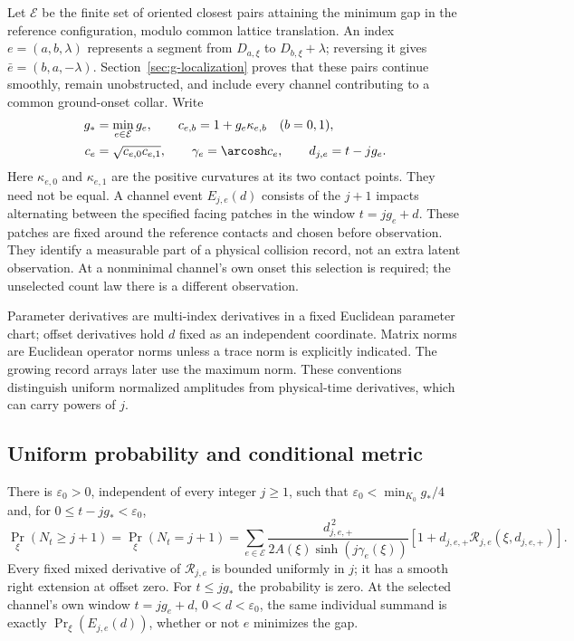 Let $\mathcal E$ be the finite set of oriented closest pairs attaining
the minimum gap in the reference configuration, modulo common lattice
translation. An index $e=(a,b,\lambda)$ represents a segment from
$D_{a,\xi}$ to $D_{b,\xi}+\lambda$; reversing it gives
$\bar e=(b,a,-\lambda)$. Section~\ref{sec:g-localization} proves that
these pairs continue smoothly, remain unobstructed, and include every
channel contributing to a common ground-onset collar. Write
\begin{equation}\label{eq:g-general-data}
 \begin{split}
 g_*&=\min_{e\in\mathcal E}g_e,\qquad
 c_{e,b}=1+g_e\kappa_{e,b}\quad(b=0,1),\\
 c_e&=\sqrt{c_{e,0}c_{e,1}},\qquad \gamma_e=\arcosh c_e,
 \qquad d_{j,e}=t-jg_e.
 \end{split}
\end{equation}
Here $\kappa_{e,0}$ and $\kappa_{e,1}$ are the positive curvatures at
its two contact points. They need not be equal. A channel event
$E_{j,e}(d)$ consists of the $j+1$ impacts alternating between the
specified facing patches in the window $t=jg_e+d$. These patches are
fixed around the reference contacts and chosen before observation.
They identify a measurable part of a physical collision record, not an
extra latent observation. At a nonminimal channel's own onset this
selection is required; the unselected count law there is a different
observation.

Parameter derivatives are multi-index derivatives in a fixed Euclidean
parameter chart; offset derivatives hold $d$ fixed as an independent
coordinate. Matrix norms are Euclidean operator norms unless a trace
norm is explicitly indicated. The growing record arrays later use the
maximum norm. These conventions distinguish uniform normalized
amplitudes from physical-time derivatives, which can carry powers of $j$.

\subsection{Uniform probability and conditional metric}
\begin{theorem}
\label{thm:g-stability}
There is $\varepsilon_0>0$, independent of every integer $j\ge1$, such
that $\varepsilon_0<\min_{K_0}g_*/4$ and, for
$0\le t-jg_*<\varepsilon_0$,
\begin{equation}\label{eq:g-competition}
 \Pr_\xi(N_t\ge j+1)=\Pr_\xi(N_t=j+1)
 =\sum_{e\in\mathcal E}
 \frac{d_{j,e,+}^{\,2}}{2A(\xi)\sinh(j\gamma_e(\xi))}
       [1+d_{j,e,+}\mathcal R_{j,e}(\xi,d_{j,e,+})].
\end{equation}
Every fixed mixed derivative of $\mathcal R_{j,e}$ is bounded uniformly
in $j$; it has a smooth right extension at offset zero. For $t\le jg_*$
the probability is zero. At the selected channel's own window
$t=jg_e+d$, $0<d<\varepsilon_0$, the same individual summand is exactly
$\Pr_\xi(E_{j,e}(d))$, whether or not $e$ minimizes the gap.
\end{theorem}

